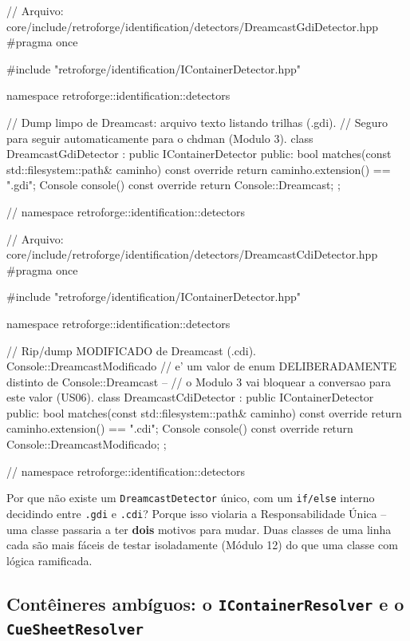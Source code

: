 \begin{CaixaCodigo}
// Arquivo: core/include/retroforge/identification/detectors/DreamcastGdiDetector.hpp
#pragma once

#include "retroforge/identification/IContainerDetector.hpp"

namespace retroforge::identification::detectors {

// Dump limpo de Dreamcast: arquivo texto listando trilhas (.gdi).
// Seguro para seguir automaticamente para o chdman (Modulo 3).
class DreamcastGdiDetector : public IContainerDetector {
public:
    bool matches(const std::filesystem::path& caminho) const override {
        return caminho.extension() == ".gdi";
    }
    Console console() const override { return Console::Dreamcast; }
};

} // namespace retroforge::identification::detectors
\end{CaixaCodigo}

\begin{CaixaCodigo}
// Arquivo: core/include/retroforge/identification/detectors/DreamcastCdiDetector.hpp
#pragma once

#include "retroforge/identification/IContainerDetector.hpp"

namespace retroforge::identification::detectors {

// Rip/dump MODIFICADO de Dreamcast (.cdi). Console::DreamcastModificado
// e' um valor de enum DELIBERADAMENTE distinto de Console::Dreamcast --
// o Modulo 3 vai bloquear a conversao para este valor (US06).
class DreamcastCdiDetector : public IContainerDetector {
public:
    bool matches(const std::filesystem::path& caminho) const override {
        return caminho.extension() == ".cdi";
    }
    Console console() const override { return Console::DreamcastModificado; }
};

} // namespace retroforge::identification::detectors
\end{CaixaCodigo}

\begin{CaixaInfo}
Por que não existe um \texttt{DreamcastDetector} único, com um \texttt{if/else} interno decidindo entre \texttt{.gdi} e \texttt{.cdi}? Porque isso violaria a Responsabilidade Única -- uma classe passaria a ter \textbf{dois} motivos para mudar. Duas classes de uma linha cada são mais fáceis de testar isoladamente (Módulo 12) do que uma classe com lógica ramificada.
\end{CaixaInfo}

\subsection{Contêineres ambíguos: o \texttt{IContainerResolver} e o \texttt{CueSheetResolver}}
\label{sec:resolver}

